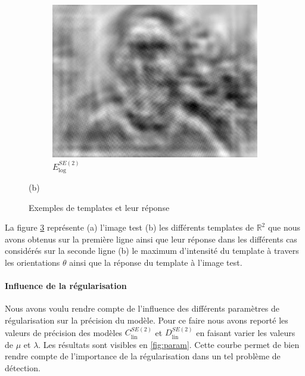 \documentclass{article}
\begin{document}
\begin{figure}[h!]
\begin{subfigure}[b]{0.1\textwidth}
        \label{fig:mean and std of net44}
    \end{subfigure}
    \hspace{-1\baselineskip}
    \quad
    \begin{subfigure}[b]{0.1\textwidth}   
        \centering 
        \includegraphics[width=\textwidth]{plots/E_log_SE2_conv.jpg}
        \caption{$E_{\text{log}}^{SE(2)}$}%
        
        \label{fig:mean and std of net44}
    \end{subfigure}

    {\small (b)}

    \caption[ The average and standard deviation of critical parameters ]
    {\small Exemples de templates et leur réponse} 
    \label{fig: template}
\end{figure}

La figure \ref{fig: template} représente (a) l'image test (b) les différents templates de $\mathbb{R}^2$ que nous avons obtenus sur la première ligne ainsi que leur réponse dans les différents 
cas considérés sur la seconde ligne (b) le maximum d'intensité du template à travers les orientations $\theta$ ainsi que la réponse du template à l'image test.

\paragraph{Influence de la régularisation}

Nous avons voulu rendre compte de l'influence des différents paramètres de régularisation sur la précision du modèle.
Pour ce faire nous avons reporté les valeurs de précision des modèles $C_{\text{lin}}^{SE(2)}$ et $D_{\text{lin}}^{SE(2)}$
en faisant varier les valeurs de $\mu$ et $\lambda$. Les résultats sont visibles en \ref{fig:param}. Cette courbe permet de bien rendre 
compte de l'importance de la régularisation dans un tel problème de détection.
\end{document}
